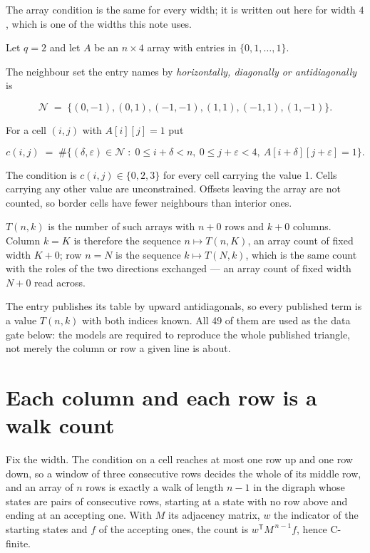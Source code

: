 \documentclass[11pt]{article}
\theoremstyle{definition}
\begin{document}
The array condition is the same for every width; it is written out here for width $4$, which is one of the widths this note uses.

Let $q = 2$ and let $A$ be an $n \times 4$ array with entries in $\{0,1,\dots,1\}$.

The neighbour set the entry names by {\itshape horizontally, diagonally or antidiagonally} is

\[\mathcal{N} \;=\; \{(0,-1), (0,1), (-1,-1), (1,1), (-1,1), (1,-1)\}.\]

For a cell $(i,j)$ with $A[i][j] = 1$ put

\[c(i,j) \;=\; \#\bigl\{(\delta,\varepsilon)\in\mathcal{N} \;:\; 0\le i+\delta<n,\ 0\le j+\varepsilon<4,\ A[i+\delta][j+\varepsilon] = 1\bigr\}.\]

The condition is $c(i,j) \in \{0, 2, 3\}$ for every cell carrying the value 1. Cells carrying any other value are unconstrained. Offsets leaving the array are not counted, so border cells have fewer neighbours than interior ones.

$T(n,k)$ is the number of such arrays with $n + 0$ rows and $k + 0$ columns. Column $k = K$ is therefore the sequence $n \mapsto T(n,K)$, an array count of fixed width $K + 0$; row $n = N$ is the sequence $k \mapsto T(N,k)$, which is the same count with the roles of the two directions exchanged --- an array count of fixed width $N + 0$ read across.

The entry publishes its table by upward antidiagonals, so every published term is a value $T(n,k)$ with both indices known. All 49 of them are used as the data gate below: the models are required to reproduce the whole published triangle, not merely the column or row a given line is about.

\section{Each column and each row is a walk count}

Fix the width. The condition on a cell reaches at most one row up and one row down, so a window of three consecutive rows decides the whole of its middle row, and an array of $n$ rows is exactly a walk of length $n-1$ in the digraph whose states are pairs of consecutive rows, starting at a state with no row above and ending at an accepting one. With $M$ its adjacency matrix, $w$ the indicator of the starting states and $f$ of the accepting ones, the count is $w^{\mathsf T}M^{\,n-1}f$, hence C-finite.
\end{document}
